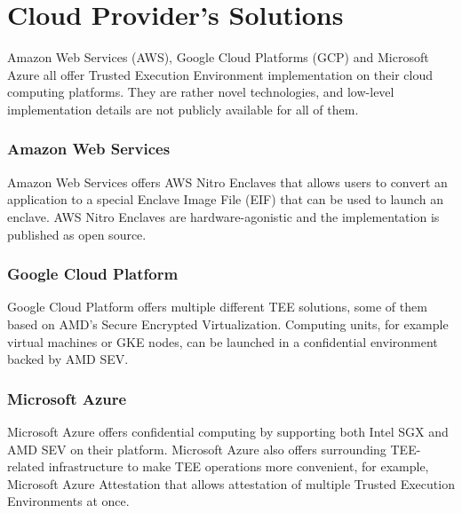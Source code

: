 \section{Cloud Provider's Solutions} \label{cloudprovider}

Amazon Web Services (AWS), Google Cloud Platforms (GCP) and Microsoft Azure all offer Trusted Execution Environment implementation on their cloud computing platforms. They are rather novel technologies, and low-level implementation details are not publicly available for all of them.

\subsubsection{Amazon Web Services} \label{aws}

Amazon Web Services offers AWS Nitro Enclaves that allows users to convert an application to a special Enclave Image File (EIF) that can be used to launch an enclave. AWS Nitro Enclaves are hardware-agonistic and the implementation is published as open source.\cite{aws}

\subsubsection{Google Cloud Platform} \label{gcp}

Google Cloud Platform offers multiple different TEE solutions, some of them based on AMD's Secure Encrypted Virtualization. Computing units, for example virtual machines or GKE nodes, can be launched in a confidential environment backed by AMD SEV.\cite{gcp}

\subsubsection{Microsoft Azure} \label{azure}

Microsoft Azure offers confidential computing by supporting both Intel SGX and AMD SEV on their platform. Microsoft Azure also offers surrounding TEE-related infrastructure to make TEE operations more convenient, for example, Microsoft Azure Attestation that allows attestation of multiple Trusted Execution Environments at once.\cite{azure}
